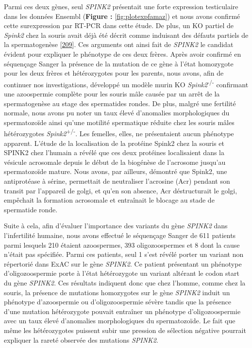 \documentclass[12pt,a4paper,twoside]{ugathesis}
\theoremstyle{definition}
\theoremstyle{definition}
\theoremstyle{definition}
\theoremstyle{remark}
\begin{document}
Parmi ces deux gènes, seul \emph{SPINK2} présentait une forte expression
testiculaire dans les données Ensembl (\textbf{Figure :
}\ref{fig:plotexpfamaz}) et nous avons confirmé cette surexpression par
RT-PCR dans cette étude. De plus, un KO partiel de \emph{Spink2} chez la
souris avait déjà été décrit comme induisant des défauts partiels de la
spermatogenèse {[}\protect\hyperlink{ref-Lee2011}{209}{]}. Ces arguments
ont ainsi fait de \emph{SPINK2} le candidat évident pour expliquer le
phénotype de ces deux frères. Après avoir confirmé en séquençage Sanger
la présence de la mutation de ce gène à l'état homozygote pour les deux
frères et hétérozygotes pour les parents, nous avons, afin de continuer
nos investigations, développé un modèle murin KO
\emph{Spink2}\textsuperscript{-/-} confirmant une azoospermie complète
pour les souris mâle causée par un arrêt de la spermatogenèse au stage
des spermatides rondes. De plus, malgré une fertilité normale, nous
avons pu noter un taux élevé d'anomalies morphologiques du spermatozoïde
ainsi qu'une motilité spermatique réduite chez les souris mâles
hétérozygotes \emph{Spink2}\textsuperscript{+/-}. Les femelles, elles,
ne présentaient aucun phénotype apparent. L'étude de la localisation de
la protéine Spink2 chez la souris et SPINK2 chez l'humain a révélé que
ces deux protéines localisaient dans la vésicule acrosomale depuis le
début de la biogénèse de l'acrosome jusqu'au spermatozoïde mature. Nous
avons, par ailleurs, démontré que Spink2, une antiprotéase à sérine,
permettait de neutraliser l'acrosine (Acr) pendant son transit par
l'appareil de golgi, et qu'en son absence, Acr déstructurait le golgi,
empêchait la formation acrosomale et entraînait le blocage au stade de
spermatide ronde.

Suite à cela, afin d'évaluer l'importance des variants du gène
\emph{SPINK2} dans l'infertilité humaine, nous avons effectué le
séquençage Sanger de 611 patients parmi lesquels 210 étaient
azoospermes, 393 oligozoospermes et 8 dont la cause n'était pas
spécifiée. Parmi ces patients, seul 1 s'est révélé porter un variant non
répertorié dans ExAC sur le gène \emph{SPINK2}. Ce patient présentant un
phénotype d'oligozoospermie porte à l'état hétérozygote un variant
altérant le codon start du gène \emph{SPINK2}. Ces résultats indiquent
donc que chez l'homme, comme chez la souris, la présence de mutations
homozygotes sur le gène \emph{SPINK2} induit un phénotype d'azoospermie
ou d'oligozoospermie sévère tandis que la présence d'une mutation
hétérozygote pouvait entraîner un phénotype d'oligozoospermie avec un
taux élevé d'anomalies morphologiques du spermatozoïde. Le fait que même
les hétérozygotes puissent subir une pression de sélection négative
pourrait expliquer la rareté observée des mutations \emph{SPINK2}.
\end{document}
